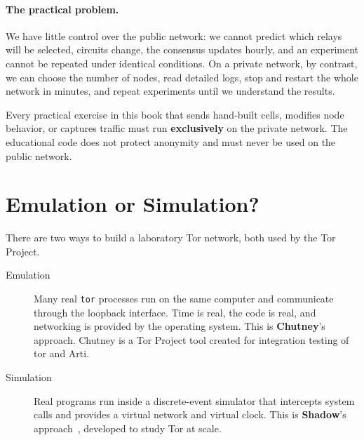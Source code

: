 \paragraph{The practical problem.} We have little control over the public network: we cannot predict which relays will be selected, circuits change, the consensus updates hourly, and an experiment cannot be repeated under identical conditions. On a private network, by contrast, we can choose the number of nodes, read detailed logs, stop and restart the whole network in minutes, and repeat experiments until we understand the results.

\begin{attenzione}
Every practical exercise in this book that sends hand-built cells, modifies node behavior, or captures traffic must run \textbf{exclusively} on the private network. The educational  code does not protect anonymity and must never be used on the public network.
\end{attenzione}

\section{Emulation or Simulation?}\label{sec:rp-strumenti}

There are two ways to build a laboratory Tor network, both used by the Tor Project.

\begin{description}
  \item[Emulation] Many real \texttt{tor} processes run on the same computer and communicate through the loopback interface. Time is real, the code is real, and networking is provided by the operating system. This is \textbf{Chutney}'s approach. Chutney is a Tor Project tool created for integration testing of tor and Arti.
  \item[Simulation] Real programs run inside a discrete-event simulator that intercepts system calls and provides a virtual network and virtual clock. This is \textbf{Shadow}'s approach~\cite{jansen2012shadow}, developed to study Tor at scale.
\end{description}

